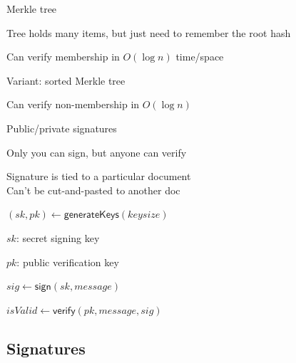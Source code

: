 \begin{frame}{Merkle tree}


\BIL	
\item Tree holds many items, but just need to remember the root hash
\item Can verify membership in $O(\log n)$ time/space
\item Variant: sorted Merkle tree
  \BI
	\item Can verify non-membership in $O(\log n)$
	\EI
\EIL
	
\end{frame}

\begin{frame}{Public/private signatures}


\BIL
\item Only you can sign, but anyone can verify
\item Signature is tied to a particular document\\
			Can't be cut-and-pasted to another doc
\EIL


\BIL
\item $(\mathit{sk}, \mathit{pk}) \gets \textsf{generateKeys}(\mathit{keysize})$
	\BI
	\item $\mathit{sk}$: secret signing key
	\item	$\mathit{pk}$: public verification key
	\EI
\item  $\mathit{sig} \gets \textsf{sign}(\mathit{sk}, \mathit{message})$
\item  $\mathit{isValid} \gets \textsf{verify}(\mathit{pk}, \mathit{message}, \mathit{sig})$
\EIL

\end{frame}

\subsection{Signatures}

